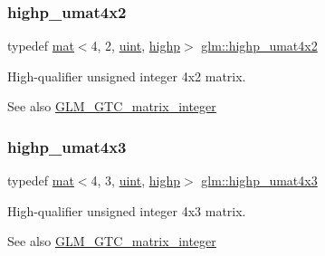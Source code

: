 \subsubsection{\texorpdfstring{highp\+\_\+umat4x2}{highp\_umat4x2}}
{\footnotesize\ttfamily typedef \mbox{\hyperlink{structglm_1_1mat}{mat}}$<$4, 2, \mbox{\hyperlink{group__core__precision_ga4fd29415871152bfb5abd588334147c8}{uint}}, \mbox{\hyperlink{namespaceglm_a36ed105b07c7746804d7fdc7cc90ff25ac6f7eab42eacbb10d59a58e95e362074}{highp}}$>$ \mbox{\hyperlink{group__gtc__matrix__integer_gaf56fa20818ea9c18fd0a4a8bf141a738}{glm\+::highp\+\_\+umat4x2}}}

High-\/qualifier unsigned integer 4x2 matrix. \begin{DoxySeeAlso}{See also}
\mbox{\hyperlink{group__gtc__matrix__integer}{G\+L\+M\+\_\+\+G\+T\+C\+\_\+matrix\+\_\+integer}} 
\end{DoxySeeAlso}
\mbox{\label{group__gtc__matrix__integer_gaf89b61119da7856a0867a43d6c25913a}} 
\subsubsection{\texorpdfstring{highp\+\_\+umat4x3}{highp\_umat4x3}}
{\footnotesize\ttfamily typedef \mbox{\hyperlink{structglm_1_1mat}{mat}}$<$4, 3, \mbox{\hyperlink{group__core__precision_ga4fd29415871152bfb5abd588334147c8}{uint}}, \mbox{\hyperlink{namespaceglm_a36ed105b07c7746804d7fdc7cc90ff25ac6f7eab42eacbb10d59a58e95e362074}{highp}}$>$ \mbox{\hyperlink{group__gtc__matrix__integer_gaf89b61119da7856a0867a43d6c25913a}{glm\+::highp\+\_\+umat4x3}}}

High-\/qualifier unsigned integer 4x3 matrix. \begin{DoxySeeAlso}{See also}
\mbox{\hyperlink{group__gtc__matrix__integer}{G\+L\+M\+\_\+\+G\+T\+C\+\_\+matrix\+\_\+integer}} 
\end{DoxySeeAlso}
\mbox{\label{group__gtc__matrix__integer_gada50011594ccf358c9eafe49ff07999f}} 
